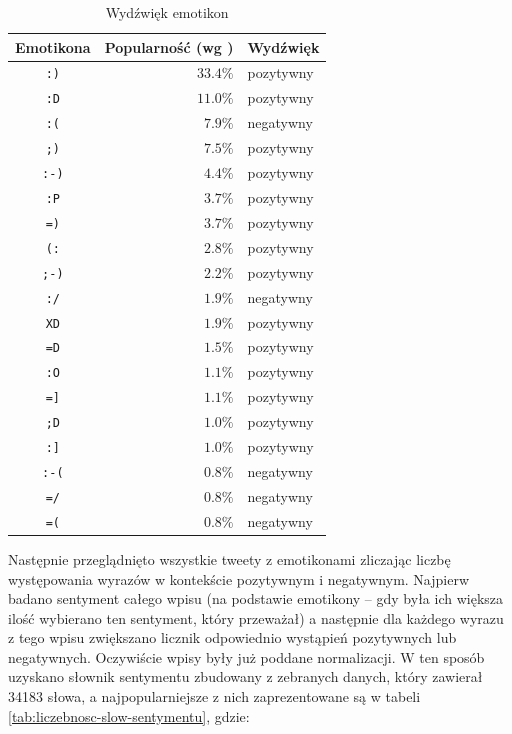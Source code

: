 \begin{table}[ht!]  
\begin{center}  
\begin{tabular}{|c|r|l|}
\hline
Emotikona & Popularność (wg \cite{EmoticonAnalysisTwitter}) &
Wydźwięk \\ \hline
\texttt{:)} & $33.4\%$ & pozytywny \\ \hline
\texttt{:D} & $11.0\%$ & pozytywny \\ \hline
\texttt{:(} & $7.9\%$ & negatywny \\ \hline
\texttt{;)} & $7.5\%$ & pozytywny \\ \hline
\texttt{:-)} & $4.4\%$ & pozytywny \\ \hline
\texttt{:P} & $3.7\%$ & pozytywny \\ \hline
\texttt{=)} & $3.7\%$ & pozytywny \\ \hline
\texttt{(:} & $2.8\%$ & pozytywny \\ \hline
\texttt{;-)} & $2.2\%$ & pozytywny \\ \hline
\texttt{:/} & $1.9\%$ & negatywny \\ \hline
\texttt{XD} & $1.9\%$ & pozytywny \\ \hline
\texttt{=D} & $1.5\%$ & pozytywny \\ \hline
\texttt{:O} & $1.1\%$ & pozytywny \\ \hline
\texttt{=]} & $1.1\%$ & pozytywny \\ \hline
\texttt{;D} & $1.0\%$ & pozytywny \\ \hline
\texttt{:]} & $1.0\%$ & pozytywny \\ \hline
\texttt{:-(} & $0.8\%$ & negatywny \\ \hline
\texttt{=/} & $0.8\%$ & negatywny \\ \hline
\texttt{=(} & $0.8\%$ & negatywny \\ \hline
\end{tabular} 
\end{center} 
\caption{Wydźwięk emotikon}
\label{tab:wydzwiek-emotikon}
\end{table}

Następnie przeglądnięto wszystkie tweety z emotikonami zliczając liczbę
występowania wyrazów w kontekście pozytywnym i negatywnym.
Najpierw badano sentyment całego wpisu (na podstawie emotikony -- gdy była ich
większa ilość wybierano ten sentyment, który przeważał) a następnie dla każdego
wyrazu z tego wpisu zwiększano licznik odpowiednio wystąpień pozytywnych lub
negatywnych. Oczywiście wpisy były już poddane normalizacji.
W ten sposób uzyskano słownik sentymentu zbudowany z zebranych danych, który
zawierał 34183 słowa, a najpopularniejsze z nich zaprezentowane są w tabeli
\ref{tab:liczebnosc-slow-sentymentu}, gdzie:

